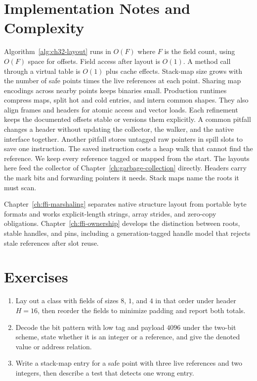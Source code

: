 \section{Implementation Notes and Complexity}\label{sec:ch32-implementation}

Algorithm~\ref{alg:ch32-layout} runs in $O(F)$ where $F$ is the field count, using $O(F)$ space for offsets.
Field access after layout is $O(1)$.
A method call through a virtual table is $O(1)$ plus cache effects.
Stack-map size grows with the number of safe points times the live references at each point.
Sharing map encodings across nearby points keeps binaries small.
Production runtimes compress maps, split hot and cold entries, and intern common shapes.
They also align frames and headers for atomic access and vector loads.
Each refinement keeps the documented offsets stable or versions them explicitly.
A common pitfall changes a header without updating the collector, the walker, and the native interface together.
Another pitfall stores untagged raw pointers in spill slots to save one instruction.
The saved instruction costs a heap walk that cannot find the reference.
We keep every reference tagged or mapped from the start.
The layouts here feed the collector of Chapter~\ref{ch:garbage-collection} directly.
Headers carry the mark bits and forwarding pointers it needs.
Stack maps name the roots it must scan.

Chapter~\ref{ch:ffi-marshaling} separates native structure layout from portable byte formats and works explicit-length strings, array strides, and zero-copy obligations.
Chapter~\ref{ch:ffi-ownership} develops the distinction between roots, stable handles, and pins, including a generation-tagged handle model that rejects stale references after slot reuse.

\section{Exercises}\label{sec:ch32-exercises}

\begin{enumerate}
\item Lay out a class with fields of sizes $8$, $1$, and $4$ in that order under header $H = 16$, then reorder the fields to minimize padding and report both totals.\label{ex:ch32-layout-order}
\item Decode the bit pattern with low tag  and payload $4096$ under the two-bit scheme, state whether it is an integer or a reference, and give the denoted value or address relation.\label{ex:ch32-decode-tag}
\item Write a stack-map entry for a safe point with three live references and two integers, then describe a test that detects one wrong entry.\label{ex:ch32-map-test}
\end{enumerate}

